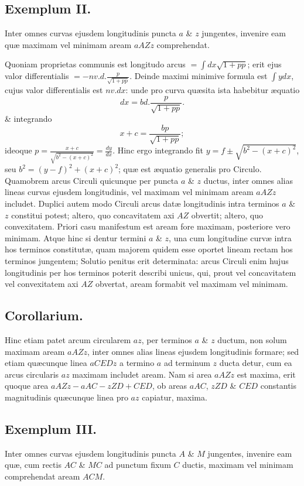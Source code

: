 \subsection*{Exemplum II.}
Inter omnes curvas ejusdem longitudinis puncta $a$ \& $z$ jungentes, invenire eam quæ maximam vel minimam aream $aAZz$ comprehendat.

Quoniam proprietas communis est longitudo arcus $=\int dx\sqrt{1+pp}$; erit ejus valor differentialis $=-nv.d.\frac{p}{\sqrt{1+pp}}$. Deinde maximi minimive formula est $\int ydx$, cujus valor differentialis est $nv.dx$: unde pro curva quæsita ista habebitur æquatio
\[
dx=bd.\frac{p}{\sqrt{1+pp}}.
\]
\& integrando
\[
x+c=\frac{bp}{\sqrt{1+pp}};
\]
ideoque $p=\frac{x+c}{\sqrt{b^2-(x+c)^2}}=\frac{dy}{dx}$. Hinc ergo integrando fit $y=f\pm\sqrt{b^2-(x+c)^2}$, seu $b^2=(y-f)^2+(x+c)^2$; quæ est æquatio generalis pro Circulo. Quamobrem arcus Circuli quicunque per puncta $a$ \& $z$ ductus, inter omnes alias lineas curvas ejusdem longitudinis, vel maximam vel minimam aream $aAZz$ includet. Duplici autem modo Circuli arcus datæ longitudinis intra terminos $a$ \& $z$ constitui potest; altero, quo concavitatem axi $AZ$ obvertit; altero, quo convexitatem. Priori casu manifestum est aream fore maximam, posteriore vero minimam. Atque hinc si dentur termini $a$ \& $z$, una cum longitudine curvæ intra hos terminos constitutæ, quam majorem quidem esse oportet lineam rectam hos terminos jungentem; Solutio penitus erit determinata: arcus Circuli enim hujus longitudinis per hos terminos poterit describi
unicus, qui, prout vel concavitatem vel convexitatem axi $AZ$ obvertat, aream formabit vel maximam vel minimam.

\subsection*{Corollarium.}
Hinc etiam patet arcum circularem $az$, per terminos $a$ \& $z$ ductum, non solum maximam aream $aAZz$, inter omnes alias lineas ejusdem longitudinis formare; sed etiam quæcunque linea $aCEDz$ a termino $a$ ad terminum $z$ ducta detur, cum ea arcus circularis $az$ maximam includet aream. Nam si area $aAZz$ est maxima, erit quoque area $aAZz-aAC-zZD+CED$, ob areas $aAC$, $zZD$ \& $CED$ constantis magnitudinis quæcunque linea pro $az$ capiatur, maxima.

\subsection*{Exemplum III.}
Inter omnes curvas ejusdem longitudinis puncta $A$ \& $M$ jungentes, invenire eam quæ, cum rectis $AC$ \& $MC$ ad punctum fixum $C$ ductis, maximam vel minimam comprehendat aream $ACM$.

